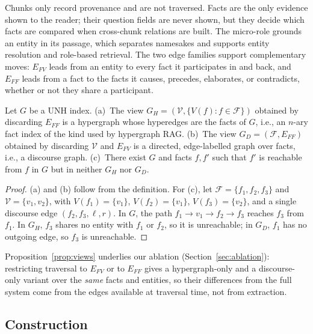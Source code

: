 \documentclass[runningheads]{llncs}
\newcommand{\sys}{UNH}
\newcommand{\Fset}{\mathcal{F}}
\newcommand{\Vset}{\mathcal{V}}
\newcommand{\Efv}{E_{FV}}
\newcommand{\Eff}{E_{FF}}
\begin{document}
Chunks only record provenance and are not traversed. Facts are the only evidence shown to the reader; their question fields are never shown, but they decide which facts are compared when cross-chunk relations are built. The micro-role grounds an entity in its passage, which separates namesakes and supports entity resolution and role-based retrieval. The two edge families support complementary moves: $\Efv$ leads from an entity to every fact it participates in and back, and $\Eff$ leads from a fact to the facts it causes, precedes, elaborates, or contradicts, whether or not they share a participant.

\begin{proposition}
\label{prop:views}
Let $G$ be a \sys{} index. (a)~The view $G_H = (\Vset, \{V(f) : f \in \Fset\})$ obtained by discarding $\Eff$ is a hypergraph whose hyperedges are the facts of $G$, i.e., an $n$-ary fact index of the kind used by hypergraph RAG. (b)~The view $G_D = (\Fset, \Eff)$ obtained by discarding $\Vset$ and $\Efv$ is a directed, edge-labelled graph over facts, i.e., a discourse graph. (c)~There exist $G$ and facts $f, f'$ such that $f'$ is reachable from $f$ in $G$ but in neither $G_H$ nor $G_D$.
\end{proposition}

\begin{proof}
(a) and (b) follow from the definition. For (c), let $\Fset = \{f_1, f_2, f_3\}$ and $\Vset = \{v_1, v_2\}$, with $V(f_1) = \{v_1\}$, $V(f_2) = \{v_1\}$, $V(f_3) = \{v_2\}$, and a single discourse edge $(f_2, f_3, \ell, r)$. In $G$, the path $f_1 \to v_1 \to f_2 \to f_3$ reaches $f_3$ from $f_1$. In $G_H$, $f_3$ shares no entity with $f_1$ or $f_2$, so it is unreachable; in $G_D$, $f_1$ has no outgoing edge, so $f_3$ is unreachable.
\end{proof}

Proposition~\ref{prop:views} underlies our ablation (Section~\ref{sec:ablation}): restricting traversal to $\Efv$ or to $\Eff$ gives a hypergraph-only and a discourse-only variant over the \emph{same} facts and entities, so their differences from the full system come from the edges available at traversal time, not from extraction.

\subsection{Construction}
\label{sec:construction}
\end{document}
